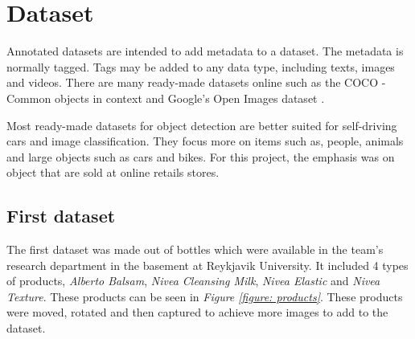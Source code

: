 \section{Dataset}
Annotated datasets are intended to add metadata to a dataset. The metadata is normally tagged. Tags may be added to any data type, including texts, images and videos. There are many ready-made datasets online such as the COCO - Common objects in context \cite{noauthor_coco_nodate} and Google’s Open Images dataset \cite{noauthor_open_nodate}.

Most ready-made datasets for object detection are better suited for self-driving cars and image classification. They focus more on items such as, people, animals and large objects such as cars and bikes. For this project, the emphasis was on object that are sold at online retails stores.
\subsection{First dataset} \label{sec:firstdataset}
The first dataset was made out of bottles which were available in the team’s research department in the basement at Reykjavik University. It included 4 types of products, \textit{Alberto Balsam}, \textit{Nivea Cleansing Milk}, \textit{Nivea Elastic} and \textit{Nivea Texture}. These products can be seen in \textit{Figure \ref{figure: products}}. These products were moved, rotated and then captured to achieve more images to add to the dataset.

